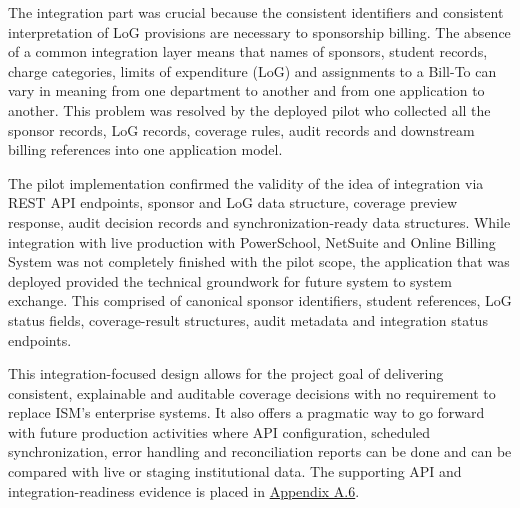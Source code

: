 \begin{itemize}
        The integration part was crucial because the consistent identifiers and consistent interpretation of LoG provisions are necessary to sponsorship billing. The absence of a common integration layer means that names of sponsors, student records, charge categories, limits of expenditure (LoG) and assignments to a Bill-To can vary in meaning from one department to another and from one application to another. This problem was resolved by the deployed pilot who collected all the sponsor records, LoG records, coverage rules, audit records and downstream billing references into one application model.
        
        The pilot implementation confirmed the validity of the idea of integration via REST API endpoints, sponsor and LoG data structure, coverage preview response, audit decision records and synchronization-ready data structures. While integration with live production with PowerSchool, NetSuite and Online Billing System was not completely finished with the pilot scope, the application that was deployed provided the technical groundwork for future system to system exchange. This comprised of canonical sponsor identifiers, student references, LoG status fields, coverage-result structures, audit metadata and integration status endpoints.
        
        This integration-focused design allows for the project goal of delivering consistent, explainable and auditable coverage decisions with no requirement to replace ISM's enterprise systems. It also offers a pragmatic way to go forward with future production activities where API configuration, scheduled synchronization, error handling and reconciliation reports can be done and can be compared with live or staging institutional data. The supporting API and integration-readiness evidence is placed in \hyperref[app:integration-evidence]{Appendix A.6}.
     

\end{itemize}
